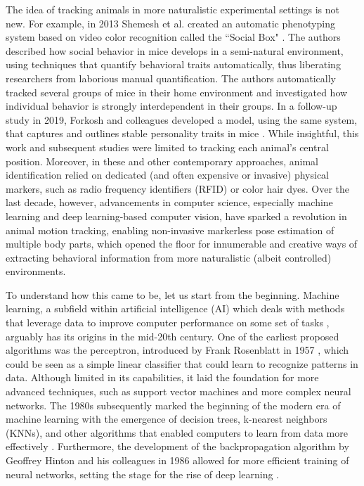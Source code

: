 The idea of tracking animals in more naturalistic experimental settings is not new. For example, in 2013 Shemesh et al. created an automatic phenotyping system based on video color recognition called the ``Social Box" \cite{Shemesh2013High-orderMice}. The authors described how social behavior in mice develops in a semi-natural environment, using techniques that quantify behavioral traits automatically, thus liberating researchers from laborious manual quantification. The authors automatically tracked several groups of mice in their home environment and investigated how individual behavior is strongly interdependent in their groups. In a follow-up study in 2019, Forkosh and colleagues developed a model, using the same system, that captures and outlines stable personality traits in mice \cite{Forkosh2019IdentityRepertoire}. While insightful, this work and subsequent studies were limited to tracking each animal's central position. Moreover, in these and other contemporary approaches, animal identification relied on dedicated (and often expensive or invasive) physical markers, such as radio frequency identifiers (RFID) or color hair dyes. Over the last decade, however, advancements in computer science, especially machine learning and deep learning-based computer vision, have sparked a revolution in animal motion tracking, enabling non-invasive markerless pose estimation of multiple body parts, which opened the floor for innumerable and creative ways of extracting behavioral information from more naturalistic (albeit controlled) environments.

To understand how this came to be, let us start from the beginning. Machine learning, a subfield within artificial intelligence (AI) which deals with methods that leverage data to improve computer performance on some set of tasks \cite{Roberts2021TheTheory}, arguably has its origins in the mid-20th century. One of the earliest proposed algorithms was the perceptron, introduced by Frank Rosenblatt in 1957 \cite{Rosenblatt1958TheBrain.}, which could be seen as a simple linear classifier that could learn to recognize patterns in data. Although limited in its capabilities, it laid the foundation for more advanced techniques, such as support vector machines and more complex neural networks. The 1980s subsequently marked the beginning of the modern era of machine learning with the emergence of decision trees, k-nearest neighbors (KNNs), and other algorithms that enabled computers to learn from data more effectively \cite{ChristopherMBishop2006PatternLearning}. Furthermore, the development of the backpropagation algorithm by Geoffrey Hinton and his colleagues in 1986 allowed for more efficient training of neural networks, setting the stage for the rise of deep learning \cite{Rumelhart1986LearningErrors}.

